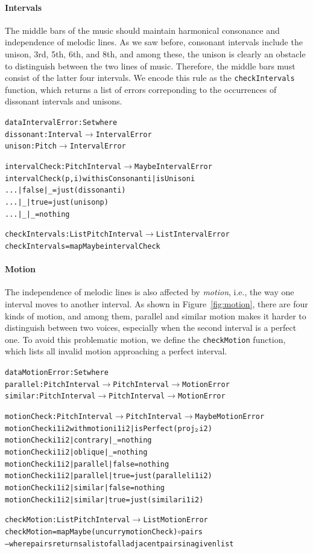\paragraph{Intervals}

The middle bars of the music should maintain harmonical consonance
and independence of melodic lines.
As we saw before, consonant intervals include the unison, 3rd, 5th,
6th, and 8th, and among these, the unison is clearly an obstacle to
distinguish between the two lines of music.
Therefore, the middle bars must consist of the latter four intervals.
We encode this rule as the \texttt{checkIntervals} function, which
returns a list of errors correponding to the occurrences of dissonant
intervals and unisons.

\begin{alltt}
data IntervalError : Set where
  dissonant : Interval \(\rightarrow\) IntervalError
  unison    : Pitch \(\rightarrow\) IntervalError

intervalCheck : PitchInterval \(\rightarrow\) Maybe IntervalError
intervalCheck (p , i) with isConsonant i | isUnison i
... | false | _    = just (dissonant i)
... | _     | true = just (unison p)
... | _     | _    = nothing

checkIntervals : List PitchInterval \(\rightarrow\) List IntervalError
checkIntervals = mapMaybe intervalCheck
\end{alltt}

\paragraph{Motion}

The independence of melodic lines is also affected by \emph{motion},
i.e., the way one interval moves to another interval.
As shown in Figure~\ref{fig:motion}, there are four kinds of motion,
and among them, parallel and similar motion makes it harder to
distinguish between two voices, especially when the second interval
is a perfect one.
To avoid this problematic motion, we define the \texttt{checkMotion}
function, which lists all invalid motion approaching a perfect interval.

\begin{alltt}
data MotionError : Set where
  parallel : PitchInterval \(\rightarrow\) PitchInterval \(\rightarrow\) MotionError
  similar  : PitchInterval \(\rightarrow\) PitchInterval \(\rightarrow\) MotionError

motionCheck : PitchInterval \(\rightarrow\) PitchInterval \(\rightarrow\) Maybe MotionError
motionCheck i1 i2 with motion i1 i2 | isPerfect (proj\(\sb{\mathtt{2}}\) i2)
motionCheck i1 i2 | contrary | \_     = nothing
motionCheck i1 i2 | oblique  | \_     = nothing
motionCheck i1 i2 | parallel | false = nothing
motionCheck i1 i2 | parallel | true  = just (parallel i1 i2)
motionCheck i1 i2 | similar  | false = nothing
motionCheck i1 i2 | similar  | true  = just (similar i1 i2)

checkMotion : List PitchInterval \(\rightarrow\) List MotionError
checkMotion = mapMaybe (uncurry motionCheck) \(\circ\) pairs
-- where pairs returns a list of all adjacent pairs in a given list
\end{alltt}

